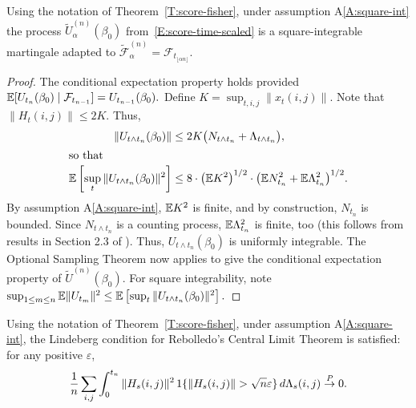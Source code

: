 \documentclass[final]{statsoc}
\begin{document}
\begin{lemma}\label{L:adapted-martingale}
Using the notation of Theorem~\ref{T:score-fisher}, under assumption
A\ref{A:square-int} the process $\tilde U_\alpha^{(n)}(\beta_0)$
from~\eqref{E:score-time-scaled} is a square-integrable martingale adapted to
\(
    \mathcal{\tilde F}^{(n)}_\alpha
        =
        \mathcal{F}_{t_{\lfloor \alpha n \rfloor}}.
\)
\end{lemma}

\begin{proof}
The conditional expectation property holds provided
\(
    \mathbb{E}[ U_{t_{n}}(\beta_0) \mid \mathcal{F}_{t_{n-1}} ]
        = U_{t_{n-1}}(\beta_0).
\)
Define $K = \sup_{t,i,j} \| x_{t}(i,j) \|$.
Note that $\|H_{t}(i,j)\| \leq 2 K$.  Thus,
\begin{align*}
    \| U_{t \wedge t_n} (\beta_0) \|
        &\leq
            2 K
            \big(
                N_{t \wedge t_n}
                +
                \Lambda_{t \wedge t_n}
            \big), \\
\intertext{so that}
    \mathbb{E} \left[
        \sup_t
        \| U_{t \wedge t_n} (\beta_0) \|^2
    \right]
        &\leq
            8 \cdot \big(\mathbb{E} K^2\big)^{1/2} \cdot
            \big(
              \mathbb{E} N_{t_n}^2
              +
              \mathbb{E} \Lambda_{t_n}^2
            \big)^{1/2}.
\end{align*}
By assumption A\ref{A:square-int}, $\mathbb{E} K^2$ is finite, and by construction,
$N_{t_n}$ is bounded.  Since $N_{t \wedge t_n}$ is a counting process,
$\mathbb{E} \Lambda_{t_n}^2$ is finite, too
(this follows from results in Section 2.3 of
\citet{fleming1991counting}).  Thus, $U_{t \wedge t_n}(\beta_0)$
is uniformly integrable.  The Optional Sampling Theorem now applies to
give the conditional expectation property of $\tilde U^{(n)}(\beta_0)$.  For
square integrability, note
\(
    \sup_{1 \leq m \leq n}
    \mathbb{E} \| U_{t_m} \|^2
        \leq
        \mathbb{E} \left[
           \sup_t
           \| U_{t \wedge t_n} (\beta_0) \|^2
        \right].
\)
\end{proof}

\begin{lemma}\label{L:Lindeberg-condition}
Using the notation of Theorem~\ref{T:score-fisher}, under assumption
A\ref{A:square-int}, the Lindeberg condition for Rebolledo's \citeyearpar{rebolledo1980central} Central Limit
Theorem is satisfied: for any positive $\varepsilon$,
\[
    \frac{1}{n}
    \sum_{i,j}
    \int_{0}^{t_n}
        \| H_s(i,j) \|^2
        \, 1\{\| H_s(i,j) \| > \sqrt{n} \varepsilon \}
        \, d\Lambda_s(i,j)
        \overset{\mathit{P}}{\to}
        0.
\]
\end{lemma}
\end{document}
